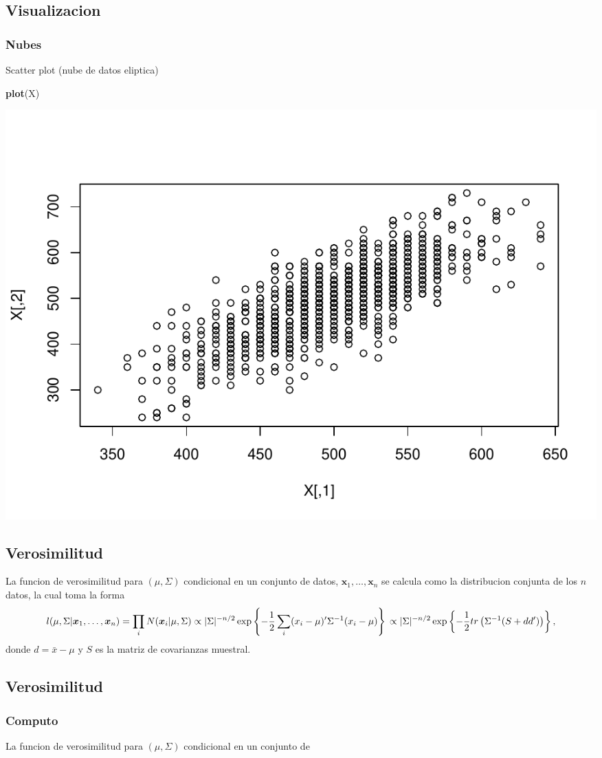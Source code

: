\documentclass[11pt,]{article}
\newenvironment{Shaded}{\begin{snugshade}}{\end{snugshade}}
\newcommand{\KeywordTok}[1]{\textcolor[rgb]{0.13,0.29,0.53}{\textbf{#1}}}
\newcommand{\NormalTok}[1]{#1}
\begin{document}
\subsection{Visualizacion}\label{visualizacion-7}

\subsubsection{Nubes}\label{nubes}

Scatter plot (nube de datos eliptica)

\begin{Shaded}
\begin{Highlighting}[]
\KeywordTok{plot}\NormalTok{(X)}
\end{Highlighting}
\end{Shaded}

\includegraphics{est46114_s02_gaussianamultivariada_files/figure-latex/plot_nube-1.pdf}

\subsection{Verosimilitud}\label{verosimilitud}

La funcion de verosimilitud para \((\mu,\Sigma)\) condicional en un
conjunto de datos, \(\boldsymbol{x}_1,\ldots,\boldsymbol{x}_n\) se
calcula como la distribucion conjunta de los \(n\) datos, la cual toma
la forma \[
l(\mu,\Sigma|\boldsymbol{x}_1,\ldots,\boldsymbol{x}_n) = \prod_{i}N(\boldsymbol{x}_i|\mu,\Sigma) \\
\propto |\Sigma|^{-n/2}\exp\left\{-\frac{1}{2}\sum_{i}(x_i-\mu)'\Sigma^{-1}(x_i-\mu)\right\}\\
\propto |\Sigma|^{-n/2}\exp\left\{-\frac{1}{2}tr\left(\Sigma^{-1}(S+dd')\right)\right\},
\] donde \(d=\bar{x}-\mu\) y \(S\) es la matriz de covarianzas muestral.

\subsection{Verosimilitud}\label{verosimilitud-1}

\subsubsection{Computo}\label{computo}

La funcion de verosimilitud para \((\mu,\Sigma)\) condicional en un
conjunto de




\newpage
\singlespacing 
\end{document}
